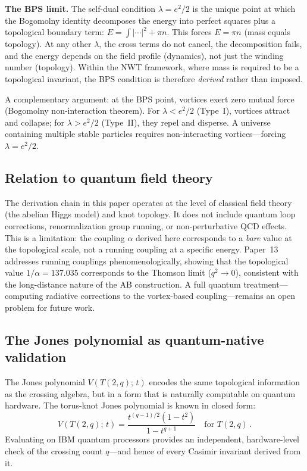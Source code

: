 \documentclass[11pt]{article}
\begin{document}
\textbf{The BPS limit.}
The self-dual condition $\lambda = e^2/2$ is the unique point at
which the Bogomolny identity decomposes the energy into perfect
squares plus a topological boundary term:
$E = \int |\cdots|^2 + \pi n$.  This forces $E = \pi n$ (mass
equals topology).  At any other $\lambda$, the cross terms do not
cancel, the decomposition fails, and the energy depends on the
field profile (dynamics), not just the winding number (topology).
Within the NWT framework, where mass is required to be a
topological invariant, the BPS condition is therefore
\emph{derived} rather than imposed.

A complementary argument: at the BPS point, vortices exert zero
mutual force (Bogomolny non-interaction theorem).  For
$\lambda < e^2/2$ (Type~I), vortices attract and collapse; for
$\lambda > e^2/2$ (Type~II), they repel and disperse.  A universe
containing multiple stable particles requires non-interacting
vortices---forcing $\lambda = e^2/2$.

\subsection{Relation to quantum field theory}

The derivation chain in this paper operates at the level of
classical field theory (the abelian Higgs model) and knot topology.
It does not include quantum loop corrections, renormalization group
running, or non-perturbative QCD effects.  This is a limitation:
the coupling $\alpha$ derived here corresponds to a \emph{bare}
value at the topological scale, not a running coupling at a
specific energy.  Paper~13 addresses running couplings
phenomenologically, showing that the topological value
$1/\alpha = 137.035$ corresponds to the Thomson limit
($q^2 \to 0$), consistent with the long-distance nature of the
AB construction.  A full quantum treatment---computing radiative
corrections to the vortex-based coupling---remains an open
problem for future work.

\subsection{The Jones polynomial as quantum-native validation}

The Jones polynomial $V(T(2,q);\,t)$ encodes the same topological
information as the crossing algebra, but in a form that is
naturally computable on quantum hardware.  The torus-knot Jones
polynomial is known in closed form:
\[
V(T(2,q);\,t) = \frac{t^{(q-1)/2}(1 - t^2)}
  {1 - t^{q+1}}
\quad \text{for } T(2,q)\,.
\]
Evaluating on IBM quantum processors provides an independent,
hardware-level check of the crossing count $q$---and hence of
every Casimir invariant derived from it.
\end{document}
